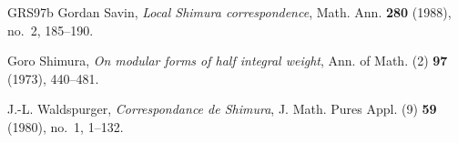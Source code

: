 \begin{thebibliography}{GRS97b}
Gordan Savin, \emph{Local {S}himura correspondence}, Math. Ann. \textbf{280}
  (1988), no.~2, 185--190. 

Goro Shimura, \emph{On modular forms of half integral weight}, Ann. of Math.
  (2) \textbf{97} (1973), 440--481. 

J.-L. Waldspurger, \emph{Correspondance de {S}himura}, J. Math. Pures Appl. (9)
  \textbf{59} (1980), no.~1, 1--132. 

\end{thebibliography}
